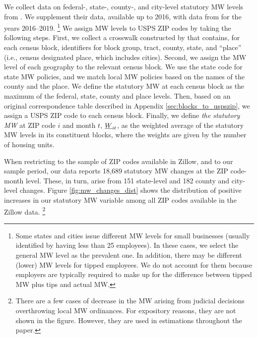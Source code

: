 We collect data on federal-, state-, county-, and city-level statutory MW levels 
from \textcite{VaghulZipperer2016}.
We supplement their data, available up to 2016, with data from 
\textcite{BerkeleyLaborCenter} for the years 2016--2019.%
\footnote{Some states and cities issue different MW levels for small businesses
(usually identified by having less than 25 employees).
In these cases, we select the general MW level as the prevalent one.
In addition, there may be different (lower) MW levels for tipped employees.
We do not account for them because employers are typically required to make up 
for the difference between tipped MW plus tips and actual MW.}
We assign MW levels to USPS ZIP codes by taking the following steps.
First, we collect a crosswalk constructed by \parencite{LODES} that contains,
for each census block, identifiers for block group, tract, county, state,
and ``place'' (i.e., census designated place, which includes cities).
Second, we assign the MW level of each geography to the relevant census block.
We use the state code for state MW policies, and we match local MW policies 
based on the names of the county and the place.
We define the statutory MW at each census block as the maximum of the federal,
state, county and place levels.
Then, based on an original correspondence table described in Appendix 
\ref{sec:blocks_to_uspszip}, we assign a USPS ZIP code to each census
block.
Finally, we define \textit{the statutory MW} at ZIP code $i$ and month $t$, $\underline{W}_{it}$, 
as the weighted average of the statutory MW levels in its constituent blocks, 
where the weights are given by the number of housing units.

When restricting 
to the sample of ZIP codes available in Zillow, and 
to our sample period, our data reports 
18,689 statutory MW changes at the ZIP code-month level.
These, in turn, arise from 
151 state-level and 
182 county and city-level changes.
%
%
Figure \ref{fig:mw_changes_dist} shows the distribution of positive increases in
our statutory MW variable among all ZIP codes available in the Zillow data.%
\footnote{There are a few cases of decrease in the MW arising from judicial 
decisions overthrowing local MW ordinances.
For expository reasons, they are not shown in the figure.
However, they are used in estimations throughout the paper.}

